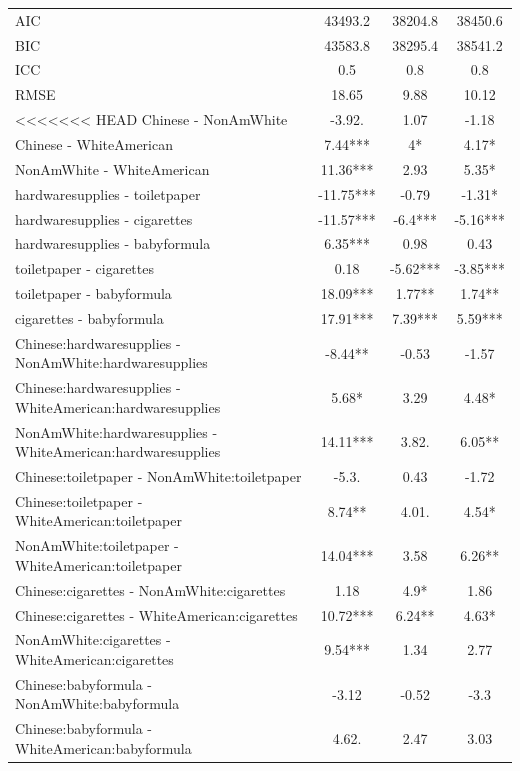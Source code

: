 \documentclass[]{report}
\begin{document}
\begin{longtable}{lccc}
			AIC & \num{43493.2} & \num{38204.8} & \num{38450.6}\\
			BIC & \num{43583.8} & \num{38295.4} & \num{38541.2}\\
			ICC & \num{0.5} & \num{0.8} & \num{0.8}\\
			RMSE & \num{18.65} & \num{9.88} & \num{10.12}\\
			\hline
<<<<<<< HEAD
		Chinese - NonAmWhite & -3.92. & 1.07 & -1.18 \\ 
		Chinese - WhiteAmerican & 7.44*** & 4* & 4.17* \\ 
		NonAmWhite - WhiteAmerican & 11.36*** & 2.93 & 5.35* \\ 
		hardwaresupplies - toiletpaper & -11.75*** & -0.79 & -1.31* \\ 
		hardwaresupplies - cigarettes & -11.57*** & -6.4*** & -5.16*** \\ 
		hardwaresupplies - babyformula & 6.35*** & 0.98 & 0.43 \\ 
		toiletpaper - cigarettes & 0.18 & -5.62*** & -3.85*** \\ 
		toiletpaper - babyformula & 18.09*** & 1.77** & 1.74** \\ 
		cigarettes - babyformula & 17.91*** & 7.39*** & 5.59*** \\ 
		Chinese:hardwaresupplies - NonAmWhite:hardwaresupplies & -8.44** & -0.53 & -1.57 \\ 
		Chinese:hardwaresupplies - WhiteAmerican:hardwaresupplies & 5.68* & 3.29 & 4.48* \\ 
		NonAmWhite:hardwaresupplies - WhiteAmerican:hardwaresupplies & 14.11*** & 3.82. & 6.05** \\ 
		Chinese:toiletpaper - NonAmWhite:toiletpaper & -5.3. & 0.43 & -1.72 \\ 
		Chinese:toiletpaper - WhiteAmerican:toiletpaper & 8.74** & 4.01. & 4.54* \\ 
		NonAmWhite:toiletpaper - WhiteAmerican:toiletpaper & 14.04*** & 3.58 & 6.26** \\ 
		Chinese:cigarettes - NonAmWhite:cigarettes & 1.18 & 4.9* & 1.86 \\ 
		Chinese:cigarettes - WhiteAmerican:cigarettes & 10.72*** & 6.24** & 4.63* \\ 
		NonAmWhite:cigarettes - WhiteAmerican:cigarettes & 9.54*** & 1.34 & 2.77 \\ 
		Chinese:babyformula - NonAmWhite:babyformula & -3.12 & -0.52 & -3.3 \\ 
		Chinese:babyformula - WhiteAmerican:babyformula & 4.62. & 2.47 & 3.03 \\ 

\end{longtable}
\end{document}
